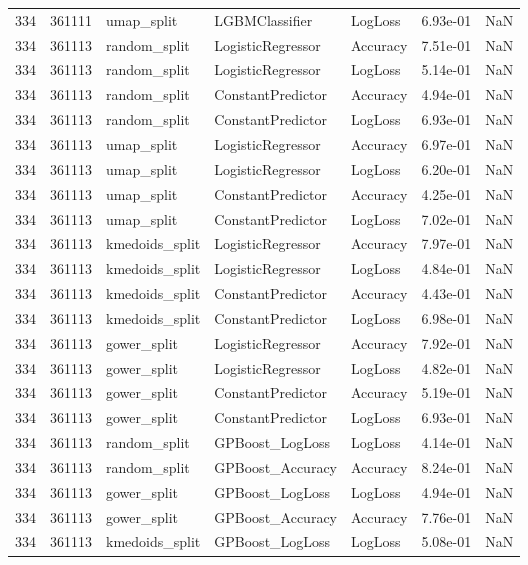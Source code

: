 \begin{tabular}{rrlllrr}
334 & 361111 & umap\_split & LGBMClassifier & LogLoss & 6.93e-01 & NaN \\
334 & 361113 & random\_split & LogisticRegressor & Accuracy & 7.51e-01 & NaN \\
334 & 361113 & random\_split & LogisticRegressor & LogLoss & 5.14e-01 & NaN \\
334 & 361113 & random\_split & ConstantPredictor & Accuracy & 4.94e-01 & NaN \\
334 & 361113 & random\_split & ConstantPredictor & LogLoss & 6.93e-01 & NaN \\
334 & 361113 & umap\_split & LogisticRegressor & Accuracy & 6.97e-01 & NaN \\
334 & 361113 & umap\_split & LogisticRegressor & LogLoss & 6.20e-01 & NaN \\
334 & 361113 & umap\_split & ConstantPredictor & Accuracy & 4.25e-01 & NaN \\
334 & 361113 & umap\_split & ConstantPredictor & LogLoss & 7.02e-01 & NaN \\
334 & 361113 & kmedoids\_split & LogisticRegressor & Accuracy & 7.97e-01 & NaN \\
334 & 361113 & kmedoids\_split & LogisticRegressor & LogLoss & 4.84e-01 & NaN \\
334 & 361113 & kmedoids\_split & ConstantPredictor & Accuracy & 4.43e-01 & NaN \\
334 & 361113 & kmedoids\_split & ConstantPredictor & LogLoss & 6.98e-01 & NaN \\
334 & 361113 & gower\_split & LogisticRegressor & Accuracy & 7.92e-01 & NaN \\
334 & 361113 & gower\_split & LogisticRegressor & LogLoss & 4.82e-01 & NaN \\
334 & 361113 & gower\_split & ConstantPredictor & Accuracy & 5.19e-01 & NaN \\
334 & 361113 & gower\_split & ConstantPredictor & LogLoss & 6.93e-01 & NaN \\
334 & 361113 & random\_split & GPBoost\_LogLoss & LogLoss & 4.14e-01 & NaN \\
334 & 361113 & random\_split & GPBoost\_Accuracy & Accuracy & 8.24e-01 & NaN \\
334 & 361113 & gower\_split & GPBoost\_LogLoss & LogLoss & 4.94e-01 & NaN \\
334 & 361113 & gower\_split & GPBoost\_Accuracy & Accuracy & 7.76e-01 & NaN \\
334 & 361113 & kmedoids\_split & GPBoost\_LogLoss & LogLoss & 5.08e-01 & NaN \\

\end{tabular}
